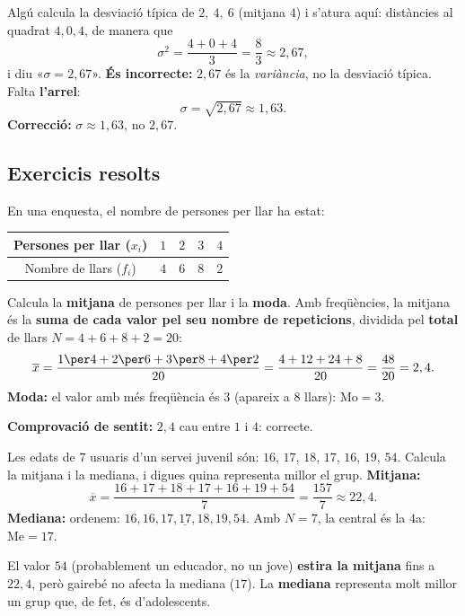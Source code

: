 \begin{exemple}
Algú calcula la desviació típica de $2,\ 4,\ 6$ (mitjana $4$) i s'atura aquí:
distàncies al quadrat $4,0,4$, de manera que
\[
\sigma^2=\frac{4+0+4}{3}=\frac{8}{3}\approx 2,67,
\]
i diu «$\sigma=2,67$». \textbf{És incorrecte:} $2,67$ és la \emph{variància}, no la
desviació típica. Falta \textbf{l'arrel}:
\[
\sigma=\sqrt{2,67}\approx 1,63.
\]
\textbf{Correcció:} $\sigma\approx 1,63$, no $2,67$.
\end{exemple}

\subsection{Exercicis resolts}

\begin{exresolt}
En una enquesta, el nombre de persones per llar ha estat:

\begin{center}
\begin{tabular}{c c c c c}
\toprule
Persones per llar ($x_i$) & $1$ & $2$ & $3$ & $4$ \\
\midrule
Nombre de llars ($f_i$) & $4$ & $6$ & $8$ & $2$ \\
\bottomrule
\end{tabular}
\end{center}

Calcula la \textbf{mitjana} de persones per llar i la \textbf{moda}.
\solucio
Amb freqüències, la mitjana és la \textbf{suma de cada valor pel seu nombre de
repeticions}, dividida pel \textbf{total} de llars $N=4+6+8+2=20$:
\[
\overline{x}=\frac{1\per 4+2\per 6+3\per 8+4\per 2}{20}
=\frac{4+12+24+8}{20}=\frac{48}{20}=2,4.
\]
\textbf{Moda:} el valor amb més freqüència és $3$ (apareix a $8$ llars):
$\text{Mo}=3$.

\textbf{Comprovació de sentit:} $2,4$ cau entre $1$ i $4$: correcte.
\end{exresolt}

\begin{exresolt}
Les edats de $7$ usuaris d'un servei juvenil són:
$16$, $17$, $18$, $17$, $16$, $19$, $54$. Calcula la mitjana i la mediana, i digues
quina representa millor el grup.
\solucio
\textbf{Mitjana:}
\[
\overline{x}=\frac{16+17+18+17+16+19+54}{7}=\frac{157}{7}\approx 22,4.
\]
\textbf{Mediana:} ordenem: $16,16,17,\underline{17},18,19,54$. Amb $N=7$, la central
és la $4$a: $\text{Me}=17$.

El valor $54$ (probablement un educador, no un jove) \textbf{estira la mitjana} fins
a $22,4$, però gairebé no afecta la mediana ($17$). La \textbf{mediana} representa
molt millor un grup que, de fet, és d'adolescents.
\end{exresolt}

